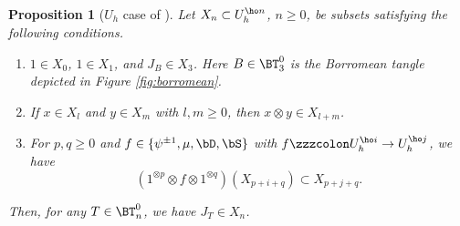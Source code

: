 \documentclass{amsart}
\numberwithin{equation}{section}
\numberwithin{figure}{section}
\theoremstyle{plain}
\newtheorem{proposition}[theorem]{Proposition}
\theoremstyle{definition}
\theoremstyle{remark}
\begin{document}
\begin{proposition}[$U_h$ case of {\cite[Corollary 9.15]{H:universal}}]
  \label{lem:1}
  Let $X_n\subset U_h^{\ho n}$, $n\ge 0$, be subsets satisfying the following
  conditions.
  \begin{enumerate}
  \item $1\in X_0$, $1\in X_1$, and $J_B\in X_3$.  Here $B\in \BT^0_3$ is the
    {\em Borromean tangle} depicted in Figure
    \ref{fig:borromean}.
  \item If $x\in X_l$ and $y\in X_m$ with $l,m\ge 0$, then $x\otimes y\in X_{l+m}$.
  \item For $p,q\ge 0$ and $f\in \{\psi ^{\pm 1},\mu ,\bD,\bS\}$ with
    $f\zzzcolon U_h^{\ho i}\rightarrow U_h^{\ho j}$, we have
    \begin{equation*}
      (1^{\otimes p}\otimes f\otimes 1^{\otimes q})(X_{p+i+q})\subset X_{p+j+q}.
    \end{equation*}
  \end{enumerate}
  Then, for any $T\in \BT^0_n$, we have $J_T\in X_n$.
\end{proposition}
\end{document}
